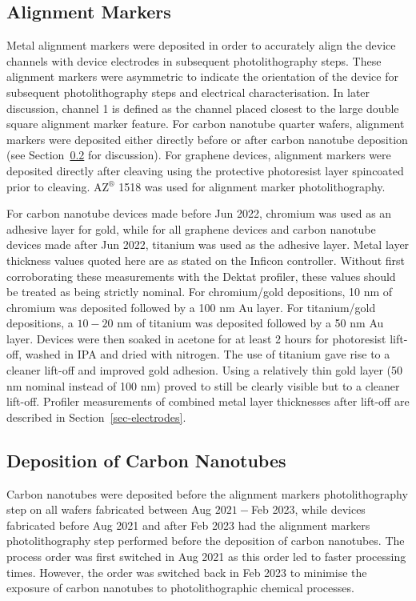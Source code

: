 \documentclass[
  a4paper,
]{scrbook}
\begin{document}
\hypertarget{sec-align}{%
\subsection{Alignment Markers}\label{sec-align}}

Metal alignment markers were deposited in order to accurately align the
device channels with device electrodes in subsequent photolithography
steps. These alignment markers were asymmetric to indicate the
orientation of the device for subsequent photolithography steps and
electrical characterisation. In later discussion, channel 1 is defined
as the channel placed closest to the large double square alignment
marker feature. For carbon nanotube quarter wafers, alignment markers
were deposited either directly before or after carbon nanotube
deposition (see Section~\ref{sec-dep-carbon-nanotubes} for discussion).
For graphene devices, alignment markers were deposited directly after
cleaving using the protective photoresist layer spincoated prior to
cleaving. AZ\(^\circledR\) 1518 was used for alignment marker
photolithography.

For carbon nanotube devices made before Jun 2022, chromium was used as
an adhesive layer for gold, while for all graphene devices and carbon
nanotube devices made after Jun 2022, titanium was used as the adhesive
layer. Metal layer thickness values quoted here are as stated on the
Inficon controller. Without first corroborating these measurements with
the Dektat profiler, these values should be treated as being strictly
nominal. For chromium/gold depositions, 10 nm of chromium was deposited
followed by a 100 nm Au layer. For titanium/gold depositions, a
\(10-20\) nm of titanium was deposited followed by a 50 nm Au layer.
Devices were then soaked in acetone for at least 2 hours for photoresist
lift-off, washed in IPA and dried with nitrogen. The use of titanium
gave rise to a cleaner lift-off and improved gold adhesion. Using a
relatively thin gold layer (50 nm nominal instead of 100 nm) proved to
still be clearly visible but to a cleaner lift-off. Profiler
measurements of combined metal layer thicknesses after lift-off are
described in Section~\ref{sec-electrodes}.

\hypertarget{sec-dep-carbon-nanotubes}{%
\subsection{Deposition of Carbon
Nanotubes}\label{sec-dep-carbon-nanotubes}}

Carbon nanotubes were deposited before the alignment markers
photolithography step on all wafers fabricated between Aug \(2021-\)Feb
2023, while devices fabricated before Aug 2021 and after Feb 2023 had
the alignment markers photolithography step performed before the
deposition of carbon nanotubes. The process order was first switched in
Aug 2021 as this order led to faster processing times. However, the
order was switched back in Feb 2023 to minimise the exposure of carbon
nanotubes to photolithographic chemical processes.
\end{document}
